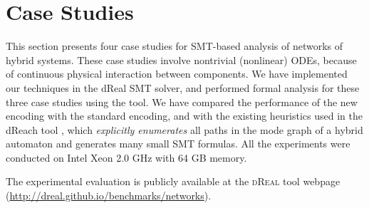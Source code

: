 
%
\section{Case Studies}
\label{sec:case-studies}

This section presents
four case studies for SMT-based analysis of 
networks of hybrid systems.
%
These case studies involve nontrivial (nonlinear) ODEs,
because of continuous physical interaction between components.
%
We have implemented our techniques in the dReal SMT solver, and 
performed formal analysis for these three case studies using the tool.
%
We have compared the performance of  the new encoding
with the standard encoding,
and with the existing heuristics used in the dReach tool \cite{dReach},
which
\emph{explicitly enumerates} all paths in the mode graph of a hybrid automaton
and generates many small SMT formulas.
%
All the experiments %
were conducted on Intel Xeon 2.0 GHz with 64 GB memory.

The experimental evaluation is publicly available at the \textsc{dReal} tool webpage (\url{http://dreal.github.io/benchmarks/networks}).


